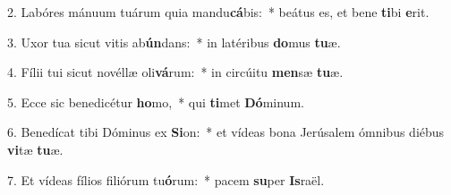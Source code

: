 2. Labóres mánuum tuárum quia mandu\textbf{cá}bis:~*  beátus es, et bene \textbf{ti}bi \textbf{e}rit.\

3. Uxor tua sicut vitis ab\textbf{ún}dans:~*  in latéribus \textbf{do}mus \textbf{tu}æ.\

4. Fílii tui sicut novéllæ oli\textbf{vá}rum:~*  in circúitu \textbf{men}sæ \textbf{tu}æ.\

5. Ecce sic benedicétur \textbf{ho}mo,~*  qui \textbf{ti}met \textbf{Dó}minum.\

6. Benedícat tibi Dóminus ex \textbf{Si}on:~*  et vídeas bona Jerúsalem ómnibus diébus \textbf{vi}tæ \textbf{tu}æ.\

7. Et vídeas fílios filiórum tu\textbf{ó}rum:~*  pacem \textbf{su}per \textbf{Is}raël.\

